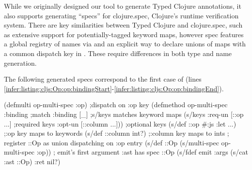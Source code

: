 \label{infer:sec:spec-extension}

While we originally designed our tool to generate Typed Clojure annotations,
it also supports generating ``specs'' for clojure.spec, Clojure's runtime
verification system.
There are key similarities between Typed Clojure and clojure.spec,
such as extensive support for potentially-tagged keyword maps,
however spec features a global registry of names
via  and
an explicit way to declare unions of maps with a common
dispatch key in .
These require differences in both type and name generation.

The following generated specs 
correspond to the first  case
of 
(lines \ref{infer:listing:cljs:Op:op:bindingStart}-\ref{infer:listing:cljs:Op:op:bindingEnd}).


\begin{minipage}{\linewidth}%
\begin{cljlistingnumbered}
  (defmulti op-multi-spec :op) ;dispatch on :op key
  (defmethod op-multi-spec :binding ;match :binding
    [_] ;s/keys matches keyword maps
    (s/keys :req-un [::op ...] ;required keys
            :opt-un [::column ...])) ;optional keys
  (s/def ::op #{:js :let ...}) ;:op key maps to keywords
  (s/def ::column int?) ;:column key maps to ints
  ; register ::Op as union dispatching on :op entry
  (s/def ::Op (s/multi-spec op-multi-spec :op))
  ; emit's first argument :ast has spec ::Op
  (s/fdef emit :args (s/cat :ast ::Op) :ret nil?)
\end{cljlistingnumbered}
\end{minipage}




%

